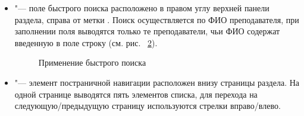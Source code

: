 \begin{itemize}
Для того, чтобы применить фильтр необходимо нажать кнопку формы , после этого в списке останутся только преподаватели, удовлетворяющие введенным параметрам, а на верхней панели подраздела появится красная иконка  


Нажатие на иконку   отменяет применённый фильтр, в списке снова отображаются все преподаватели.
Пример результата фильтрации приведён на рисунке~\ref{instructor:list_filter_result}.

	\begin{figure}[H]
	\caption{Результат применения фильтра}
	\label{instructor:list_filter_result}
	\end{figure}
	
	\item {} "--- поле быстрого поиска расположено в правом углу верхней панели раздела, справа от метки . Поиск осуществляется по ФИО преподавателя, при заполнении поля выводятся только те преподаватели, чьи ФИО содержат введенную в поле строку (см. рис. ~\ref{instructor:list_search}).
	
	\begin{figure}[H]
	\caption{Применение быстрого поиска}
	\label{instructor:list_search}
	\end{figure}
	
	\item {} "--- элемент постраничной навигации          
 расположен внизу страницы раздела. На одной странице выводятся пять элементов списка, для перехода на следующую/предыдущую страницу используются стрелки вправо/влево.
	
\end{itemize}


